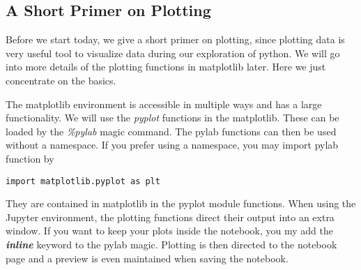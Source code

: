 \documentclass[11pt]{article}
\begin{document}
    \hypertarget{a-short-primer-on-plotting}{%
\subsection{A Short Primer on
Plotting}\label{a-short-primer-on-plotting}}

Before we start today, we give a short primer on plotting, since
plotting data is very useful tool to visualize data during our
exploration of python. We will go into more details of the plotting
functions in matplotlib later. Here we just concentrate on the basics.

The matplotlib environment is accessible in multiple ways and has a
large functionality. We will use the \emph{pyplot} functions in the
matplotlib. These can be loaded by the \emph{\%pylab} magic command. The
pylab functions can then be used without a namespace. If you prefer
using a namespace, you may import pylab function by

\begin{verbatim}
import matplotlib.pyplot as plt
\end{verbatim}

They are contained in matplotlib in the pyplot module functions. When
using the Jupyter environment, the plotting functions direct their
output into an extra window. If you want to keep your plots inside the
notebook, you my add the \textbf{\emph{inline}} keyword to the pylab
magic. Plotting is then directed to the notebook page and a preview is
even maintained when saving the notebook.
\end{document}
